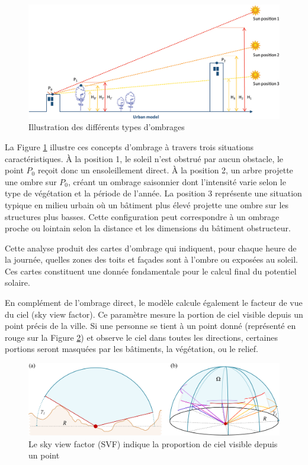 \begin{figure}[H]
    \centering
    \includegraphics[width=1.00\linewidth]{02-main/figures/ch2/cadastre_solaire_ombrage.jpg}
    \caption{Illustration des différents types d'ombrages \cite{desthieux_solar_2018}}
    \label{fig:cadastre_solaire_ombrage}
\end{figure}

La Figure \ref{fig:cadastre_solaire_ombrage} illustre ces concepts d'ombrage à travers trois situations caractéristiques. À la position 1, le soleil n'est obstrué par aucun obstacle, le point $P_0$ reçoit donc un ensoleillement direct. À la position 2, un arbre projette une ombre sur $P_0$, créant un ombrage saisonnier dont l'intensité varie selon le type de végétation et la période de l'année. La position 3 représente une situation typique en milieu urbain où un bâtiment plus élevé projette une ombre sur les structures plus basses. Cette configuration peut correspondre à un ombrage proche ou lointain selon la distance et les dimensions du bâtiment obstructeur.

Cette analyse produit des cartes d'ombrage qui indiquent, pour chaque heure de la journée, quelles zones des toits et façades sont à l'ombre ou exposées au soleil. Ces cartes constituent une donnée fondamentale pour le calcul final du potentiel solaire.

En complément de l'ombrage direct, le modèle calcule également le facteur de vue du ciel (sky view factor). Ce paramètre mesure la portion de ciel visible depuis un point précis de la ville. Si une personne se tient à un point donné (représenté en rouge sur la Figure \ref{fig:cadastre_solaire_svf}) et observe le ciel dans toutes les directions, certaines portions seront masquées par les bâtiments, la végétation, ou le relief.

\begin{figure}[H]
    \centering
    \includegraphics[width=1\linewidth]{02-main/figures/ch2/ch2_cadastre_solaire_svf.png}
    \caption{Le sky view factor (SVF) indique la proportion de ciel visible depuis un point \cite{zaksek_sky-view_2011}}
    \label{fig:cadastre_solaire_svf}
\end{figure}

